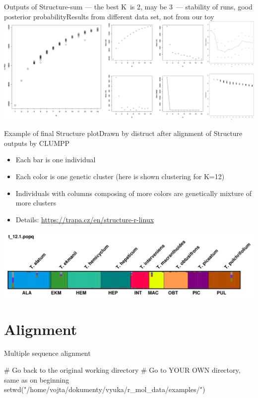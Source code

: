 \documentclass[compress, ucs, xelatex, 11pt, xcolor=svgnames,
	hyperref={
		bookmarks=true,
		unicode=true,
		colorlinks=true,
		pdftitle={Molecular data in R},
		plainpages=false,
		pdfauthor={Vojtech Zeisek},
		pdfsubject={Course about phylogeny and evolution in R},
		pdfcreator={XeLaTeX},
		pdfkeywords={R, evolution, phylogeny, molecular data},
		linkcolor=Tomato,
		anchorcolor=SaddleBrown,
		citecolor=Goldenrod,
		filecolor=DarkMagenta,
		menucolor=Sienna,
		urlcolor=DarkTurquoise,
		pdftex},
	url={hyphens, lowtilde} %
	]{beamer}
\begin{document}
\begin{frame}{Outputs of Structure-sum --- the best K~is 2, may be 3~--- stability of runs, good posterior probability}{Results from different data set, not from our toy}
	\includegraphics[width=\textwidth]{structure.png}
\end{frame}

\begin{frame}{Example of final Structure plot}{Drawn by distruct after alignment of Structure outputs by CLUMPP}
	\begin{itemize}
		\item Each bar is one individual
		\item Each color is one genetic cluster (here is shown clustering for K=12)
		\item Individuals with columns composing of more colors are genetically mixture of more clusters
		\item Details: \url{https://trapa.cz/en/structure-r-linux}
	\end{itemize}
	\includegraphics[width=\textwidth]{structure-fin.png}
\end{frame}

\section{Alignment}

\begin{frame}[fragile]{Multiple sequence alignment}
	\tableofcontents[currentsection, sectionstyle=show/hide, hideothersubsections]
	\vfill
	\begin{spluscode}
    # Go back to the original working directory
    # Go to YOUR OWN directory, same as on beginning
    setwd("/home/vojta/dokumenty/vyuka/r_mol_data/examples/")
	\end{spluscode}
\end{frame}
\end{document}
